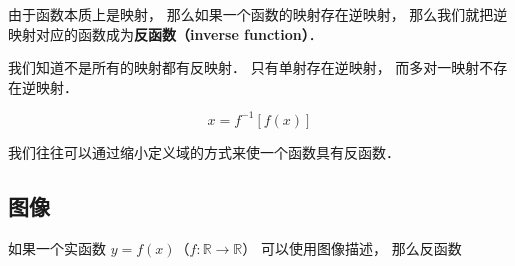 
\begin{issues}
\issueDraft
\end{issues}

由于函数本质上是映射， 那么如果一个函数的映射存在逆映射， 那么我们就把逆映射对应的函数成为\textbf{反函数（inverse function）}．

我们知道不是所有的映射都有反映射． 只有单射存在逆映射， 而多对一映射不存在逆映射．

\begin{equation}
x = f^{-1}[f(x)]
\end{equation}

我们往往可以通过缩小定义域的方式来使一个函数具有反函数．

\subsection{图像}
如果一个实函数 $y = f(x)$（$f: \mathbb R \to \mathbb R$） 可以使用图像描述， 那么反函数
